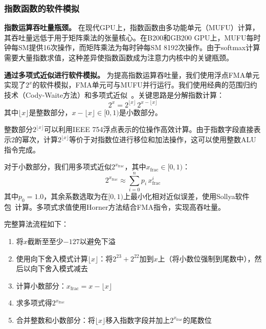 \subsubsection{指数函数的软件模拟}

\textbf{指数运算吞吐量瓶颈。}
在现代GPU上，指数函数由多功能单元（MUFU）计算，其吞吐量远低于用于矩阵乘法的张量核心。在B200和GB200 GPU上，MUFU每时钟每SM提供16次操作，而矩阵乘法为每时钟每SM 8192次操作。由于softmax计算需要大量指数求值，这种差异使指数函数成为注意力内核中的关键瓶颈。

\textbf{通过多项式近似进行软件模拟。}
为提高指数运算吞吐量，我们使用浮点FMA单元实现了$2^x$的软件模拟，FMA单元可与MUFU并行运行。我们使用经典的范围归约技术（Cody-Waite方法）和多项式近似~\citep{muller2018handbook}。关键思路是分解指数计算：
{\setlength{\abovedisplayskip}{2pt}%
 \setlength{\belowdisplayskip}{2pt}%
 \setlength{\abovedisplayshortskip}{3pt}%
 \setlength{\belowdisplayshortskip}{3pt}%
\begin{equation}
2^x = 2^{\lfloor x \rfloor}\,2^{x-\lfloor x \rfloor}
\end{equation}}
其中$\lfloor x \rfloor$是整数部分，$x - \lfloor x \rfloor \in [0, 1)$是小数部分。

整数部分$2^{\lfloor x \rfloor}$可以利用IEEE 754浮点表示的位操作高效计算。由于指数字段直接表示2的幂次，计算$2^{\lfloor x \rfloor}$等价于对指数位进行移位和加法操作，这可以使用整数ALU指令完成。

对于小数部分，我们用多项式近似$2^{x_{\text{frac}}}$，其中$x_{\text{frac}} \in [0, 1)$：
\begin{equation}
2^{x_{\text{frac}}} \approx \sum_{i=0}^{n} p_i\, x_{\text{frac}}^i
\end{equation}
其中$p_0 = 1.0$，其余系数选取为在$[0, 1)$上最小化相对近似误差，使用Sollya软件包~\citep{chevillard2010sollya}计算。多项式求值使用Horner方法结合FMA指令，实现高吞吐量。

完整算法流程如下：
\begin{enumerate}
\item 将$x$截断至至少$-127$以避免下溢
\item 使用向下舍入模式计算$\lfloor x \rfloor$：将$2^{23} + 2^{22}$加到$x$上（将小数位强制到尾数中），然后以向下舍入模式减去
\item 计算小数部分：$x_{\text{frac}} = x - \lfloor x \rfloor$
\item 求多项式得$2^{x_{\text{frac}}}$
\item 合并整数和小数部分：将$\lfloor x \rfloor$移入指数字段并加上$2^{x_{\text{frac}}}$的尾数位
\end{enumerate}


